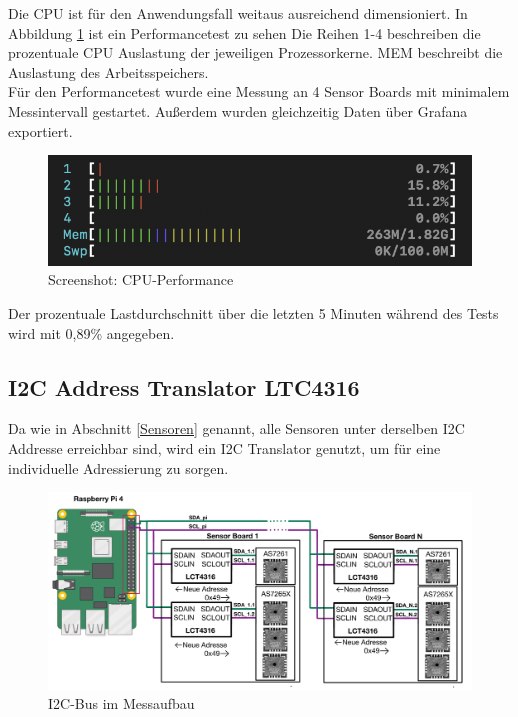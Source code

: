 Die CPU ist für den Anwendungsfall weitaus ausreichend dimensioniert.
In Abbildung \ref{fig:CPU-Performance} ist ein Performancetest zu sehen Die Reihen 1-4 beschreiben die prozentuale CPU Auslastung der jeweiligen Prozessorkerne.
MEM beschreibt die Auslastung des Arbeitsspeichers.\\
Für den Performancetest wurde eine Messung an 4 Sensor Boards mit minimalem Messintervall gestartet.
Außerdem wurden gleichzeitig Daten über Grafana exportiert.\\
\begin{figure}[H]
  \centering
  \includegraphics[width=0.7\linewidth]{img/CPU-Performance.png}
  \caption{Screenshot: CPU-Performance}
  \label{fig:CPU-Performance}
\end{figure}
\noindent Der prozentuale Lastdurchschnitt über die letzten 5 Minuten während des Tests wird mit 0,89\% angegeben.

\subsection{I2C Address Translator LTC4316}\label{I2C-Translator}
Da wie in Abschnitt \ref{Sensoren} genannt, alle Sensoren unter derselben I2C Addresse erreichbar sind, wird ein I2C Translator genutzt, um für eine individuelle Adressierung zu sorgen.\\

\begin{figure}[H]
  \centering
 \includegraphics[width=1\linewidth]{img/Adress-Translation}
  \caption{I2C-Bus im Messaufbau \cite{raspberrypi_fundation}}
    \label{fig:adress-translation}
\end{figure}

